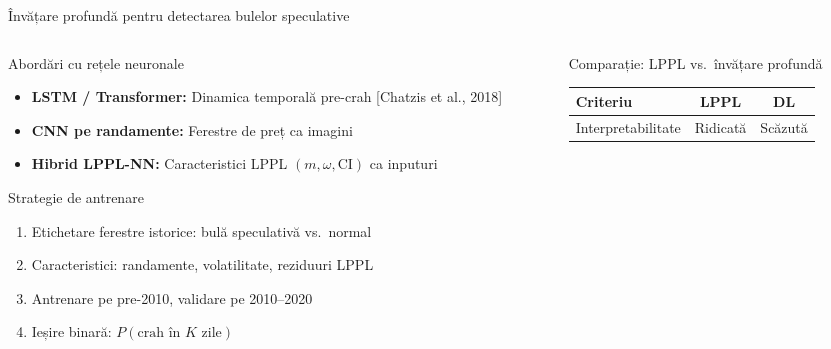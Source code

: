 \documentclass[9pt, aspectratio=169, t]{beamer}
\begin{document}
\begin{frame}{Învățare profundă pentru detectarea bulelor speculative}
    \begin{cminipage}{0.95\textwidth}
    {\scriptsize
    \begin{columns}[T]
        \begin{column}{0.47\textwidth}
            \begin{block}{Abordări cu rețele neuronale}
                \begin{itemize}\setlength{\itemsep}{0pt}
                    \item \textbf{LSTM / Transformer:} Dinamica temporală pre-crah [Chatzis et al., 2018]
                    \item \textbf{CNN pe randamente:} Ferestre de preț ca imagini
                    \item \textbf{Hibrid LPPL-NN:} Caracteristici LPPL $(m, \omega, \text{CI})$ ca inputuri
                \end{itemize}
            \end{block}
            \vspace{-2mm}
            \begin{exampleblock}{Strategie de antrenare}
                \begin{enumerate}\setlength{\itemsep}{0pt}
                    \item Etichetare ferestre istorice: bulă speculativă vs.\ normal
                    \item Caracteristici: randamente, volatilitate, reziduuri LPPL
                    \item Antrenare pe pre-2010, validare pe 2010--2020
                    \item Ieșire binară: $P(\text{crah în } K \text{ zile})$
                \end{enumerate}
            \end{exampleblock}
        \end{column}
        \begin{column}{0.47\textwidth}
            \begin{alertblock}{Comparație: LPPL vs.\ învățare profundă}
                {\scriptsize
                \begin{center}
                    \begin{tabular}{lcc}
                        \toprule
                        \textbf{Criteriu} & \textbf{LPPL} & \textbf{DL} \\
                        \midrule
                        Interpretabilitate & Ridicată & Scăzută \\

\end{tabular}
\end{center}}
\end{alertblock}
\end{column}
\end{columns}}
\end{cminipage}
\end{frame}
\end{document}
